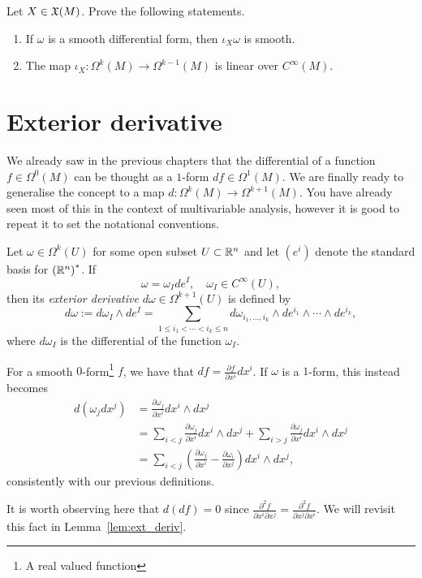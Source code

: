 \begin{exercise}
	Let $X\in\mathfrak{X}(M)$. Prove the following statements.
	\begin{enumerate}
		\item If $\omega$ is a smooth differential form, then $\iota_X\omega$ is smooth.
		\item The map $\iota_X:\Omega^k(M)\to\Omega^{k-1}(M)$ is linear over $C^\infty(M)$.
	\end{enumerate}
\end{exercise}

\section{Exterior derivative}

We already saw in the previous chapters that the differential of a function $f\in\Omega^0(M)$ can be thought as a $1$-form $df\in\Omega^1(M)$.
We are finally ready to generalise the concept to a map $d:\Omega^k(M)\to\Omega^{k+1}(M)$.
You have already seen most of this in the context of multivariable analysis, however it is good to repeat it to set the notational conventions.

\begin{definition}
	Let $\omega\in\Omega^k(U)$ for some open subset $U\subset\mathbb{R}^n$ and let $(e^i)$ denote the standard basis for ${(\mathbb{R}^n)}^*$. If
	\begin{equation}
		\omega = \omega_I de^I, \quad \omega_I\in C^\infty(U),
	\end{equation}
	then its \emph{exterior derivative} $d\omega \in\Omega^{k+1}(U)$ is defined by
	\begin{equation}
		d\omega := d\omega_I \wedge de^I = \sum_{1\leq i_1 < \cdots < i_k \leq n} d\omega_{i_1,\ldots,i_k}\wedge de^{i_1}\wedge\cdots\wedge de^{i_k},
	\end{equation}
	where $d\omega_I$ is the differential of the function $\omega_I$.
\end{definition}

\begin{example}
	For a smooth $0$-form\footnote{A real valued function} $f$, we have that $df = \frac{\partial f}{\partial x^i}dx^i$.
	If $\omega$ is a $1$-form, this instead becomes
	\begin{align}
		d(\omega_j dx^j)
		 & = \frac{\partial \omega_j}{\partial x^i} dx^i \wedge dx^j                                                                                  \\
		 & = \sum_{i<j} \frac{\partial \omega_j}{\partial x^i} dx^i \wedge dx^j  + \sum_{i>j} \frac{\partial \omega_j}{\partial x^i} dx^i \wedge dx^j \\
		 & = \sum_{i<j} \left(\frac{\partial \omega_j}{\partial x^i} - \frac{\partial \omega_i}{\partial x^j} \right) dx^i\wedge dx^j,
	\end{align}
	consistently with our previous definitions.

	It is worth observing here that $d(df) = 0$ since $\frac{\partial^2 f}{\partial x^i \partial x^j} = \frac{\partial^2 f}{\partial x^j \partial x^i}$.
	We will revisit this fact in Lemma~\ref{lem:ext_deriv}.
\end{example}

